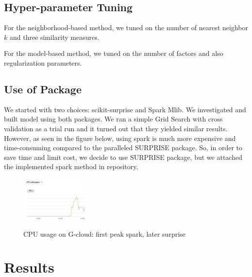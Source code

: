 \documentclass[12pt,journal,compsoc]{IEEEtran}
\begin{document}
\subsection{Hyper-parameter Tuning}

For the neighborhood-based method, we tuned on the number of nearest neighbor $k$ and three similarity measures.

For the model-based method, we tuned on the number of factors and also regularization parameters.

\subsection{Use of Package}

We started with two choices: scikit-surprise and Spark Mlib. We investigated and built model using both packages. We ran a simple Grid Search with cross validation as a trial run and it turned out that they yielded similar results. However, as seen in the figure below, using spark is much more expensive and time-consuming compared to the paralleled SURPRISE package. So, in order to save time and limit cost, we decide to use SURPRISE package, but we attached the implemented spark method in repository. 
\begin{figure}[H]
\centering
\caption{CPU usage on G-cloud: first peak spark, later surprise}
\includegraphics[width=0.30\textwidth]{img/cpu.png}
\label{fig_sim}
\end{figure}



\section{Results}
\end{document}
